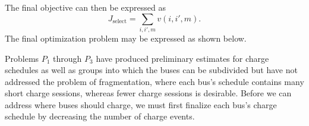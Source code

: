 The final objective can then be expressed as
\begin{equation}\label{eqn:groups:objective}
	J_{\text{select}} = \sum_{i,i',m} v(i,i',m).
\end{equation}
The final optimization problem may be expressed as shown below. \\[0.1in]
\par Problems $P_1$ through $P_3$ have produced preliminary estimates for charge schedules as well as groups into which the buses can be subdivided but have not addressed the problem of fragmentation, where each bus's schedule contains many short charge sessions, whereas fewer charge sessions is desirable. Before we can address where buses should charge, we must first finalize each bus's charge schedule by decreasing the number of charge events.
